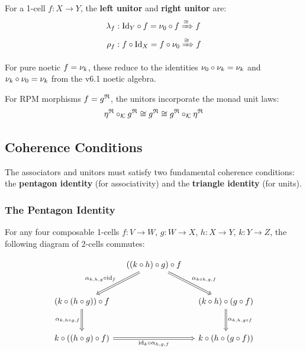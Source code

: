\begin{definition}
\label{def:tks-unitors}
For a 1-cell $f : X \to Y$, the \textbf{left unitor} and \textbf{right unitor} are:
\begin{align*}
  \lambda_f &: \mathrm{Id}_Y \circ f = \nu_{0} \circ f \xRightarrow{\cong} f \\
  \rho_f &: f \circ \mathrm{Id}_X = f \circ \nu_{0} \xRightarrow{\cong} f
\end{align*}

For pure noetic $f = \nu_{k}$, these reduce to the identities $\nu_{0} \circ \nu_{k} = \nu_{k}$
and $\nu_{k} \circ \nu_{0} = \nu_{k}$ from the v6.1 noetic algebra.

For RPM morphisms $f = g^{\mathfrak{R}}$, the unitors incorporate the monad unit laws:
\[
  \eta^{\mathfrak{R}} \circ_{\mathcal{K}} g^{\mathfrak{R}} \cong g^{\mathfrak{R}} \cong g^{\mathfrak{R}} \circ_{\mathcal{K}} \eta^{\mathfrak{R}}
\]
\end{definition}

\subsection{Coherence Conditions}

The associators and unitors must satisfy two fundamental coherence conditions:
the \textbf{pentagon identity} (for associativity) and the \textbf{triangle identity}
(for units).

\subsubsection{The Pentagon Identity}

\begin{definition}
\label{def:pentagon}
For any four composable 1-cells $f : V \to W$, $g : W \to X$, $h : X \to Y$, $k : Y \to Z$,
the following diagram of 2-cells commutes:

\[
\begin{tikzcd}[column sep=small, row sep=large]
  & ((k \circ h) \circ g) \circ f
    \arrow[dl, Rightarrow, "\alpha_{k,h,g} \circ \mathrm{id}_f"']
    \arrow[dr, Rightarrow, "\alpha_{k \circ h, g, f}"]
  & \\
  (k \circ (h \circ g)) \circ f
    \arrow[d, Rightarrow, "\alpha_{k, h \circ g, f}"']
  & &
  (k \circ h) \circ (g \circ f)
    \arrow[d, Rightarrow, "\alpha_{k, h, g \circ f}"]
  \\
  k \circ ((h \circ g) \circ f)
    \arrow[rr, Rightarrow, "\mathrm{id}_k \circ \alpha_{h,g,f}"']
  & &
  k \circ (h \circ (g \circ f))
\end{tikzcd}
\]
\end{definition}

